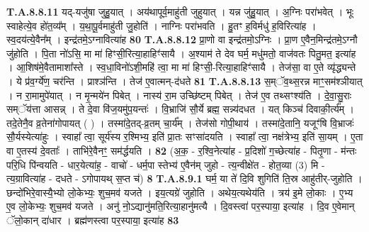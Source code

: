 \documentclass[17pt]{extarticle}
\begin{document}
                                                                  \textbf{ T.A.8.8.11} \newline
                  यद्-यजु॑षा जुहु॒यात् । अय॑थापूर्व॒माहु॑ती जुहुयात् । यन्न जु॑हु॒यात् । अ॒ग्निः परा॑भवेत् । भूः स्वाहेत्ये॒व हो॑त॒व्य᳚म् । य॒था॒पू॒र्वमाहु॑ती जु॒होति॑ । नाग्निः परा॑भवति । हु॒तꣳ ह॒विर्मधु॑ ह॒विरित्या॑ह ।  स्व॒दय॑त्ये॒वैन᳚म् । इन्द्र॑तमे॒ऽग्नावित्या॑ह \textbf{ 80} \newline
                  \newline
                                                                  \textbf{ T.A.8.8.12} \newline
                  प्रा॒णो वा इन्द्र॑तमो॒ऽग्निः । प्रा॒ण ए॒वैन॒मिन्द्र॑तमे॒ऽग्नौ जु॑होति ।  पि॒ता नो॑ऽसि॒ मा मा॑ हिꣳसी॒रित्या॒हाहिꣳ॑सायै ।  अ॒श्याम॑ ते देव घर्म॒ मधु॑मतो॒ वाज॑वतः पितु॒मत॒ इत्या॑ह । आ॒शिष॑मे॒वैतामाशा᳚स्ते ।  स्व॒धा॒विनो॑ऽशी॒महि॑ त्वा॒ मा मा॑ हिꣳसी॒-रित्या॒हाहिꣳ॑सायै । तेज॑सा॒ वा ए॒ते व्यृ॑द्ध्यन्ते । ये प्र॑व॒र्ग्ये॑ण॒ चर॑न्ति । प्राश्ञ॑न्ति ।  तेज॑ ए॒वात्मन्-द॑धते \textbf{ 81} \newline
                  \newline
                                                                  \textbf{ T.A.8.8.13} \newline
                  स॒म्ॅव॒थ्स॒रन्न माꣳ॒॒सम॑श्ञीयात् । न रा॒मामुपे॑यात् । न मृ॒न्मये॑न पिबेत् । नास्य॑ रा॒म उच्छि॑ष्टम् पिबेत् । तेज॑ ए॒व तथ्सꣳश्य॑ति ।  दे॒वा॒सु॒राः सम्ॅय॑त्ता आसन्न् । ते दे॒वा वि॑ज॒यमु॑प॒यन्तः॑ । वि॒भ्राजि॑ सौ॒र्ये ब्रह्म॒ सन्न्य॑दधत । यत् किञ्च॑ दिवाकी॒र्त्य᳚म् ।  तदे॒तेनै॒व व्र॒तेना॑गोपायत् ( ) । तस्मा॑दे॒तद्-व्र॒तम् चा॒र्य᳚म् । तेज॑सो गोपी॒थाय॑ । तस्मा॑दे॒तानि॒ यजूꣳ॑षि वि॒भ्राजः॑ सौ॒र्यस्येत्या॑हुः ।  स्वाहा᳚ त्वा॒ सूर्य॑स्य र॒श्मिभ्य॒ इति॑ प्रा॒तः सꣳसा॑दयति । स्वाहा᳚ त्वा॒ नक्ष॑त्रेभ्य॒ इति॑ सा॒यम् ।  ए॒ता वा ए॒तस्य॑ दे॒वताः᳚ । ताभि॑रे॒वैनꣳ॒॒ सम॑र्द्धयति । \textbf{ 82} \newline
                  \newline
                                                        (अ॒क॒ - र॒श्वि॒नेत्या॑ह - प्र॒दिशो॑ ग॒च्छेत्या॑ह - पितृ॒णा - म॑न्तः परि॒धि पि॑न्वयति - धार॒येत्या॑ह॒ - वाचो॑ - धर्म॒पा स्तेभ्य॑ ए॒वैन॑म् जुहो - त्य॒न्वीक्षे॑त - होत॒व्या (3) मि - त्य॒ग्रावित्या॑ह - दधते - ऽगोपायथ् स॒प्त च॑) \textbf{8} \newline \newline
                                \textbf{ T.A.8.9.1} \newline
                  घर्म॒ या ते॑ दि॒वि शुगिति॑ ति॒स्र आहु॑तीर्-जुहोति ।  छन्दो॑भिरे॒वास्यै॒भ्यो लो॒केभ्यः॒ शुच॒मव॑ यजते । इय॒त्यग्रे॑ जुहोति । अथेय॒त्यथेय॑ति । त्रय॑ इ॒मे लो॒काः ।  ए॒भ्य ए॒व लो॒केभ्यः॒ शुच॒मव॑ यजते ।  अनु॑ नो॒ऽद्यानु॑मति॒रित्या॒हानु॑मत्यै । दि॒वस्त्वा॑ पर॒स्पाया॒ इत्या॑ह । दि॒व ए॒वेमान् ॅलो॒कान् दा॑धार ।  ब्रह्म॑णस्त्वा पर॒स्पाया॒ इत्या॑ह \textbf{ 83} \newline
\end{document}
